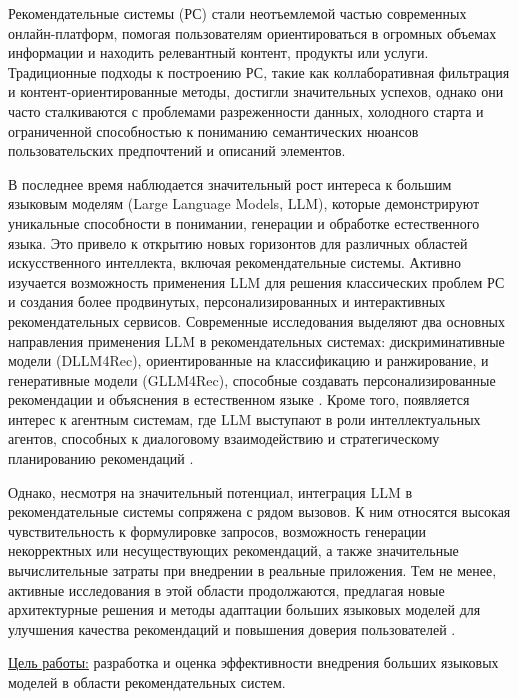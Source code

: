 Рекомендательные системы (РС) стали неотъемлемой частью современных онлайн-платформ, помогая пользователям ориентироваться в огромных объемах информации и находить релевантный контент, продукты или услуги. Традиционные подходы к построению РС, такие как коллаборативная фильтрация и контент-ориентированные методы, достигли значительных успехов, однако они часто сталкиваются с проблемами разреженности данных, холодного старта и ограниченной способностью к пониманию семантических нюансов пользовательских предпочтений и описаний элементов.

В последнее время наблюдается значительный рост интереса к большим языковым моделям (Large Language Models, LLM), которые демонстрируют уникальные способности в понимании, генерации и обработке естественного языка. Это привело к открытию новых горизонтов для различных областей искусственного интеллекта, включая рекомендательные системы. Активно изучается возможность применения LLM для решения классических проблем РС и создания более продвинутых, персонализированных и интерактивных рекомендательных сервисов. Современные исследования выделяют два основных направления применения LLM в рекомендательных системах: дискриминативные модели (DLLM4Rec), ориентированные на классификацию и ранжирование, и генеративные модели (GLLM4Rec), способные создавать персонализированные рекомендации и объяснения в естественном языке \citep{wu2024surveylargelanguagemodels}. Кроме того, появляется интерес к агентным системам, где LLM выступают в роли интеллектуальных агентов, способных к диалоговому взаимодействию и стратегическому планированию рекомендаций \citep{peng2025surveyllmpoweredagentsrecommender}.

Однако, несмотря на значительный потенциал, интеграция LLM в рекомендательные системы сопряжена с рядом вызовов. К ним относятся высокая чувствительность к формулировке запросов, возможность генерации некорректных или несуществующих рекомендаций, а также значительные вычислительные затраты при внедрении в реальные приложения. Тем не менее, активные исследования в этой области продолжаются, предлагая новые архитектурные решения и методы адаптации больших языковых моделей для улучшения качества рекомендаций и повышения доверия пользователей \citep{vats2024exploringimpactlargelanguage}.


\underline{Цель работы:} разработка и оценка эффективности внедрения больших языковых моделей в области рекомендательных систем.

